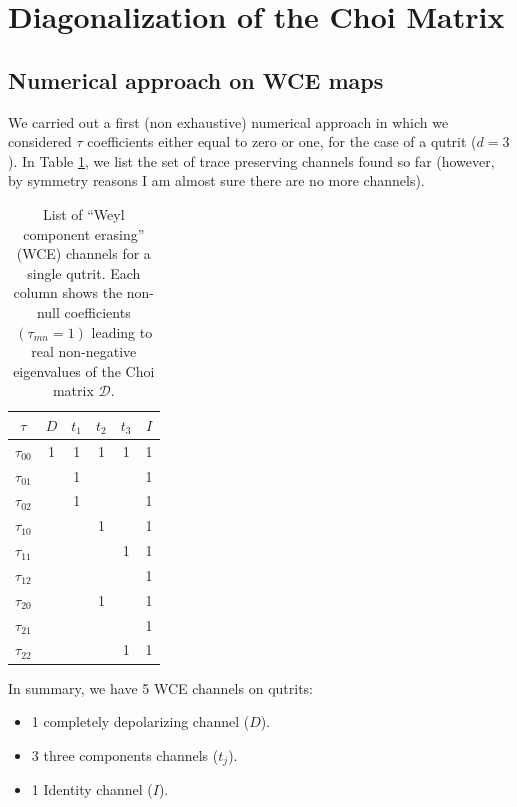\section{Diagonalization of the Choi Matrix}
% 
\subsection{Numerical approach on WCE maps}
% 
We carried out a first (non exhaustive) numerical approach in which we considered $\tau$ coefficients either equal to zero or one, for the case of a qutrit ($d=3$). In Table \ref{Table1}, we list the set of trace preserving channels found so far (however, by symmetry reasons I am almost sure there are no more channels).
% 
\begin{table}[h]
 \centering
\begin{tabular}{ |c|c|c|c|c|c| } 
\hline
$\tau$ & $D$ & $t_1$ &$t_2$ &$t_3$ & $I$\\
\hline
$\tau_{00}$ & 1 & 1 & 1 & 1& 1\\ 
\hline
$\tau_{01}$ &  & 1 & && 1\\ 
\hline
$\tau_{02}$ & & 1 & && 1\\ 
\hline
$\tau_{10}$ & &  & 1 & & 1\\ 
\hline
$\tau_{11}$ &  &  & & 1& 1\\ 
\hline
$\tau_{12}$ &  &  & && 1\\ 
\hline
$\tau_{20}$ &  &  & 1&& 1\\ 
\hline
$\tau_{21}$ &  &  & && 1\\ 
\hline
$\tau_{22}$ &  &  & & 1& 1\\ 
\hline
\end{tabular}
\caption{List of ``Weyl component erasing'' (WCE) channels for a single qutrit. Each column shows the non-null coefficients $(\tau_{mn}=1)$ leading to real non-negative eigenvalues of the Choi matrix $\mathcal{D}$.}
\label{Table1}
\end{table}
% 

In summary, we have 5 WCE channels on qutrits:
\begin{itemize}
 \item 1 completely depolarizing channel ($D$).
 \item 3 three components channels ($t_j$).
 \item 1 Identity channel ($I$).
\end{itemize}

